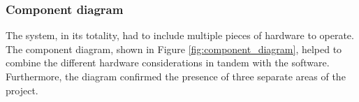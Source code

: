 \subsubsection{Component diagram}
\begin{figure}[h!]
\end{figure}
The system, in its totality, had to include multiple pieces of hardware to operate. The component diagram, shown in Figure \ref{fig:component_diagram}, helped to combine the different hardware considerations in tandem with the software. Furthermore, the diagram confirmed the presence of three separate areas of the project.

